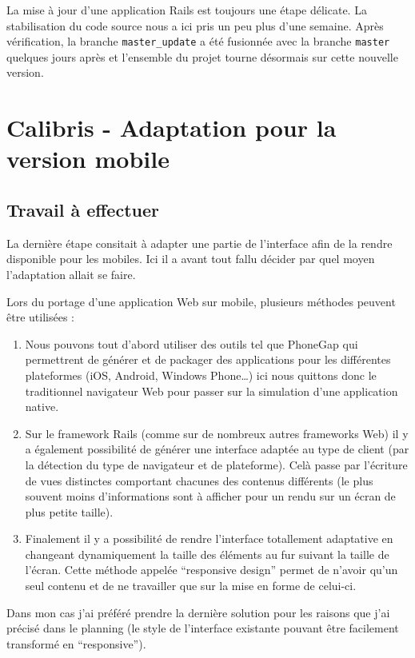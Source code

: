 \documentclass[12pt,a4paper]{book}
\begin{document}
La mise à jour d'une application Rails est toujours une étape délicate. La stabilisation du code source nous a ici pris un peu plus d'une semaine. Après vérification, la branche \texttt{master\_update} a été fusionnée avec la branche \texttt{master} quelques jours après et l'ensemble du projet tourne désormais sur cette nouvelle version.

\section{Calibris - Adaptation pour la version mobile}

\label{section.mobile_dev}

\subsection{Travail à effectuer}

La dernière étape consitait à adapter une partie de l'interface afin de la rendre disponible pour les mobiles. Ici il a avant tout fallu décider par quel moyen l'adaptation allait se faire.

Lors du portage d'une application Web sur mobile, plusieurs méthodes peuvent être utilisées :
\begin{enumerate}
  \item Nous pouvons tout d'abord utiliser des outils tel que PhoneGap qui permettrent de générer et de packager des applications pour les différentes plateformes (iOS, Android, Windows Phone…) ici nous quittons donc le traditionnel navigateur Web pour passer sur la simulation d'une application native.
  \item Sur le framework Rails (comme sur de nombreux autres frameworks Web) il y a également possibilité de générer une interface adaptée au type de client (par la détection du type de navigateur et de plateforme). Celà passe par l'écriture de vues distinctes comportant chacunes des contenus différents (le plus souvent moins d'informations sont à afficher pour un rendu sur un écran de plus petite taille).
  \item Finalement il y a possibilité de rendre l'interface totallement adaptative en changeant dynamiquement la taille des éléments au fur suivant la taille de l'écran. Cette méthode appelée ``responsive design'' permet de n'avoir qu'un seul contenu et de ne travailler que sur la mise en forme de celui-ci.
\end{enumerate}

Dans mon cas j'ai préféré prendre la dernière solution pour les raisons que j'ai précisé dans le planning (le style de l'interface existante pouvant être facilement transformé en ``responsive'').
\end{document}
